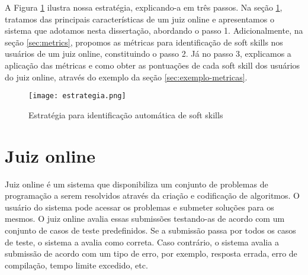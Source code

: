 

A Figura \ref{fig:estrategia} ilustra nossa estratégia, explicando-a em três passos.
Na seção \ref{sec:huxley}, tratamos das principais características de um juiz online e apresentamos o sistema que adotamos nesta dissertação, abordando o passo 1. Adicionalmente, na seção \ref{sec:metrics}, propomos as métricas para identificação de soft skills nos usuários de um juiz online, constituindo o passo 2. Já no passo 3, explicamos a aplicação das métricas e como obter as pontuações de cada soft skill dos usuários do juiz online, através do exemplo da seção \ref{sec:exemplo-metricas}.

\begin{figure}[ht]
\centering
\caption{\small Estratégia para identificação automática de soft skills} 
\texttt{[image: estrategia.png]}
\label{fig:estrategia}
\end{figure}

\section{Juiz online} 
\label{sec:huxley}

Juiz online é um sistema que disponibiliza um conjunto de problemas de programação a serem resolvidos através da criação e codificação de algoritmos. O usuário do sistema pode acessar os problemas e submeter soluções para os mesmos. O juiz online avalia essas submissões testando-as de acordo com um conjunto de casos de teste predefinidos. Se a submissão passa por todos os casos de teste, o sistema a avalia como correta. Caso contrário, o sistema avalia a submissão de acordo com um tipo de erro, por exemplo, resposta errada, erro de compilação, tempo limite excedido, etc.

